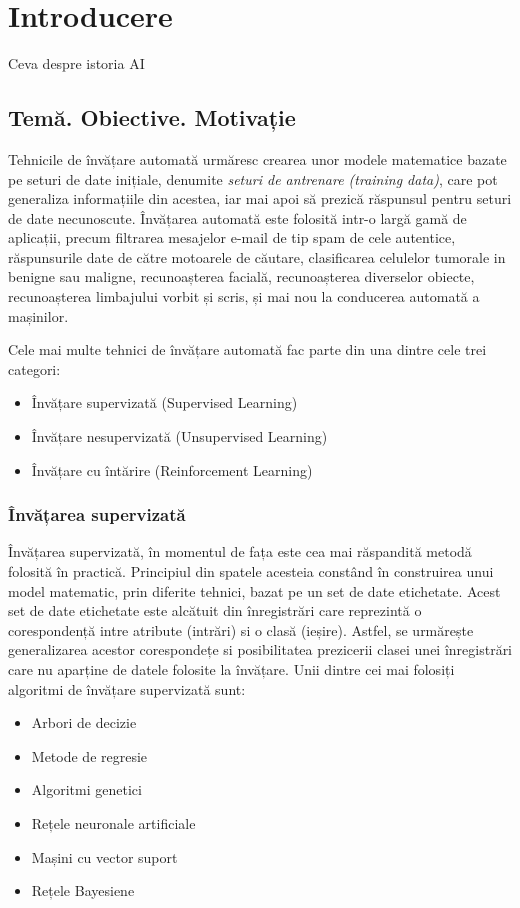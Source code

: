 \chapter{Introducere}\label{ch:1intro}
Ceva despre istoria AI
\section{Temă. Obiective. Motivație}
Tehnicile de învățare automată urmăresc crearea unor modele matematice bazate pe seturi de date inițiale, denumite \textit{seturi de antrenare (training data)}, care pot generaliza informațiile din acestea, iar mai apoi să prezică răspunsul pentru seturi de date necunoscute. Învățarea automată este folosită intr-o largă gamă de aplicații, precum filtrarea mesajelor e-mail de tip spam de cele autentice, răspunsurile date de către motoarele de căutare, clasificarea celulelor tumorale in benigne sau maligne, recunoașterea facială, recunoașterea diverselor obiecte, recunoașterea limbajului vorbit și scris, și mai nou la conducerea automată a mașinilor. 

Cele mai multe tehnici de învățare automată fac parte din una dintre cele trei categori:
\begin{itemize}
	\item Învățare supervizată (Supervised Learning)
	\item Învățare nesupervizată (Unsupervised Learning)
	\item Învățare cu întărire (Reinforcement Learning)
\end{itemize}

\subsection*{Învățarea supervizată}
Învățarea supervizată, în momentul de fața este cea mai răspandită metodă folosită în practică. Principiul din spatele acesteia constând în construirea unui model matematic, prin diferite tehnici, bazat pe un set de date etichetate. Acest set de date etichetate este alcătuit din înregistrări care reprezintă o corespondență intre atribute (intrări) si o clasă (ieșire). Astfel, se urmărește generalizarea acestor corespondețe si posibilitatea prezicerii clasei unei înregistrări care nu aparține de datele folosite la învățare. Unii dintre cei mai folosiți algoritmi de învățare supervizată sunt:
\begin{itemize}
	\item Arbori de decizie
	\item Metode de regresie
	\item Algoritmi genetici
	\item Rețele neuronale artificiale
	\item Mașini cu vector suport
	\item Rețele Bayesiene
\end{itemize}

